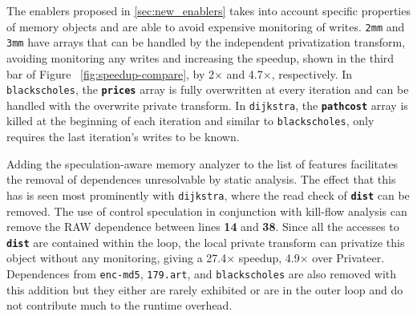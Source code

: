The enablers proposed in
\cref{sec:new_enablers} takes into account specific properties of memory
objects and are able to avoid expensive monitoring of writes.
\texttt{2mm} and \texttt{3mm} have arrays that can be handled by
the independent privatization transform, avoiding monitoring any
writes and increasing the speedup, shown in the third bar of Figure
~\ref{fig:speedup-compare}, by 2$\times$ and 4.7$\times$,
respectively. In \texttt{blackscholes}, the \texttt{\textbf{prices}} array
is fully overwritten at every iteration and can be handled with the
overwrite private transform. In \texttt{dijkstra},
the \texttt{\textbf{pathcost}} array is killed at the beginning of each
iteration and similar to \texttt{blackscholes}, only requires the last
iteration's writes to be known.

Adding the speculation-aware
memory analyzer to the list of features facilitates the removal of
dependences unresolvable by static analysis.
The effect that this has is seen most prominently with \texttt{dijkstra},
where the read check of \texttt{\textbf{dist}} can be removed. The use of
control speculation in conjunction with kill-flow analysis can remove the
RAW dependence between lines \textbf{14} and \textbf{38}. Since all the
accesses to \texttt{\textbf{dist}} are contained within the loop, the local
private transform can privatize this object without any monitoring, giving
a 27.4$\times$ speedup, 4.9$\times$ over Privateer.
Dependences from \texttt{enc-md5}, \texttt{179.art}, and
\texttt{blackscholes} are also removed with this addition but they either
are rarely exhibited or are in the outer loop and do not contribute much to
the runtime overhead.

